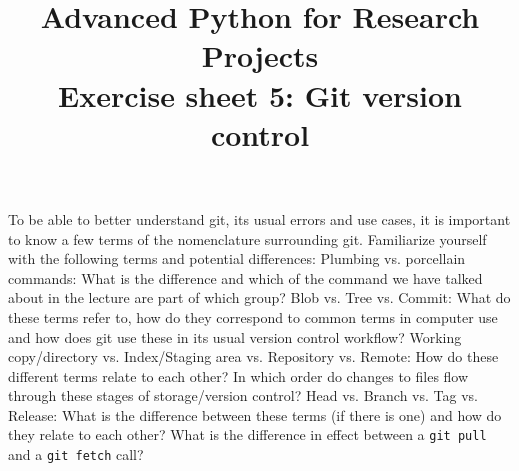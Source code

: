 \documentclass[]{erlangen-problemset}
\title{{\Large Advanced Python for Research Projects} \\[0.3cm] 
Exercise sheet 5: Git version control}
\begin{document}



\begin{problem}[title={Some git nomenclature}]
To be able to better understand git, its usual errors and use cases, it is important to know a few terms of the nomenclature surrounding git. 
Familiarize yourself with the following terms and potential differences:
\noindent
\Question Plumbing vs. porcellain commands: What is the difference and which of the command we have talked about in the lecture are part of which group?
\Question Blob vs. Tree vs. Commit: What do these terms refer to, how do they correspond to common terms in computer use and how does git use these in its usual version control workflow?
\Question Working copy/directory vs. Index/Staging area vs. Repository vs. Remote: 
How do these different terms relate to each other? 
In which order do changes to files flow through these stages of storage/version control?
\Question Head vs. Branch vs. Tag vs. Release: What is the difference between these terms (if there is one) and how do they relate to each other?
\Question What is the difference in effect between a \texttt{git pull} and a \texttt{git fetch} call?
\end{problem}
\end{document}
